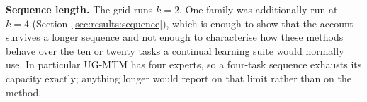 \textbf{Sequence length.} The grid runs $k = 2$. One family was additionally
run at $k = 4$ (Section~\ref{sec:results:sequence}), which is enough to show
that the account survives a longer sequence and not enough to characterise how
these methods behave over the ten or twenty tasks a continual learning suite
would normally use. In particular UG-MTM has four experts, so a four-task
sequence exhausts its capacity exactly; anything longer would report on that
limit rather than on the method.
